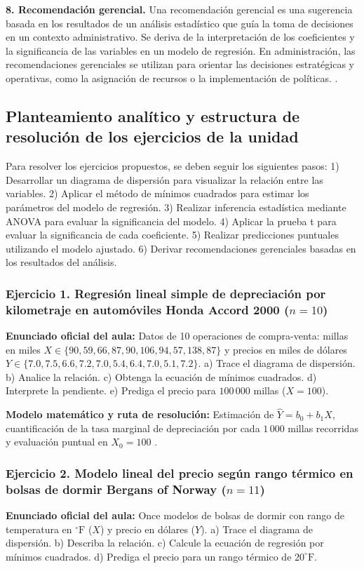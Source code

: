 {\textbf{8. Recomendación gerencial.} Una recomendación gerencial es una sugerencia basada en los resultados de un análisis estadístico que guía la toma de decisiones en un contexto administrativo. Se deriva de la interpretación de los coeficientes y la significancia de las variables en un modelo de regresión.  En administración, las recomendaciones gerenciales se utilizan para orientar las decisiones estratégicas y operativas, como la asignación de recursos o la implementación de políticas. \citep{anderson2012,lind2012,wackerly2010}.


\subsection{Planteamiento analítico y estructura de resolución de los ejercicios de la unidad}
Para resolver los ejercicios propuestos, se deben seguir los siguientes pasos: 1) Desarrollar un diagrama de dispersión para visualizar la relación entre las variables. 2) Aplicar el método de mínimos cuadrados para estimar los parámetros del modelo de regresión. 3) Realizar inferencia estadística mediante ANOVA para evaluar la significancia del modelo. 4) Aplicar la prueba t para evaluar la significancia de cada coeficiente. 5) Realizar predicciones puntuales utilizando el modelo ajustado. 6) Derivar recomendaciones gerenciales basadas en los resultados del análisis.

\subsubsection*{Ejercicio 1. Regresión lineal simple de depreciación por kilometraje en automóviles Honda Accord 2000 ($n=10$)}
\textbf{Enunciado oficial del aula:} Datos de 10 operaciones de compra-venta: millas en miles $X \in \{90, 59, 66, 87, 90, 106, 94, 57, 138, 87\}$ y precios en miles de dólares $Y \in \{7.0, 7.5, 6.6, 7.2, 7.0, 5.4, 6.4, 7.0, 5.1, 7.2\}$. a) Trace el diagrama de dispersión. b) Analice la relación. c) Obtenga la ecuación de mínimos cuadrados. d) Interprete la pendiente. e) Prediga el precio para $100\,000$ millas ($X = 100$).

\textbf{Modelo matemático y ruta de resolución:} Estimación de $\hat{Y} = b_0 + b_1 X$, cuantificación de la tasa marginal de depreciación por cada $1\,000$ millas recorridas y evaluación puntual en $X_0 = 100$ \citep{anderson2012}.

\subsubsection*{Ejercicio 2. Modelo lineal del precio según rango térmico en bolsas de dormir Bergans of Norway ($n=11$)}
\textbf{Enunciado oficial del aula:} Once modelos de bolsas de dormir con rango de temperatura en $^\circ\text{F}$ ($X$) y precio en dólares ($Y$). a) Trace el diagrama de dispersión. b) Describa la relación. c) Calcule la ecuación de regresión por mínimos cuadrados. d) Prediga el precio para un rango térmico de $20^\circ\text{F}$.

}
